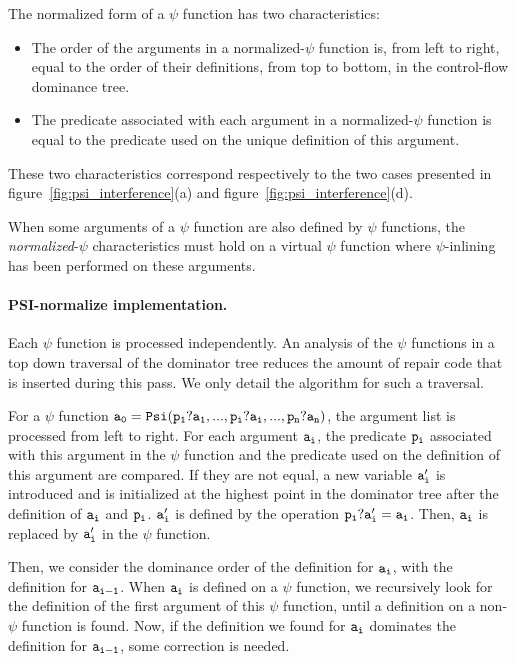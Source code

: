 The normalized form of a $\psi$ function has two characteristics:

\begin{itemize}
\item The order of the arguments in a normalized-$\psi$ function is,
from left to right, equal to the order of their definitions, from top
to bottom, in the control-flow dominance tree.
\item The predicate associated with each argument in a
normalized-$\psi$ function is equal to the predicate used on the
unique definition of this argument.
\end{itemize}

These two characteristics correspond respectively to the two cases
presented in figure~\ref{fig:psi_interference}(a) and
figure~\ref{fig:psi_interference}(d).

When some arguments of a $\psi$ function are also defined by $\psi$
functions, the {\em normalized}-$\psi$ characteristics must hold on a
virtual $\psi$ function where $\psi$-inlining has been performed on
these arguments.

\paragraph{PSI-normalize implementation.}

Each $\psi$ function is processed independently. An analysis of the
$\psi$ functions in a top down traversal of the dominator tree
reduces the amount of repair code that is inserted during this pass. We
only detail the algorithm for such a traversal.

For a $\psi$ function ${\tt a_0 = Psi(p_1?a_1, ..., p_i?a_i, ...,
  p_n?a_n)}$, the argument list is processed from left to right. For
each argument ${\tt a_i}$, the predicate ${\tt p_i}$ associated with this argument
in the $\psi$ function and the predicate used on the definition of
this argument are compared. If they are not equal, a new variable
${\tt a'_i}$ is introduced and is initialized at the highest point in the
dominator tree after the definition of ${\tt a_i}$ and ${\tt p_i}$. ${\tt a'_i}$ is
defined by the operation ${\tt p_i? a'_i = a_i}$. Then, ${\tt a_i}$ is
replaced by ${\tt a'_i}$ in the $\psi$ function.

Then, we consider the dominance order of the definition for ${\tt a_i}$,
with the definition for ${\tt a_{i-1}}$. When ${\tt a_i}$ is defined on a
$\psi$ function, we recursively look for the definition of the first
argument of this $\psi$ function, until a definition on a non-$\psi$
function is found. Now, if the definition we found for ${\tt a_i}$
dominates the definition for ${\tt a_{i-1}}$, some correction is needed.

